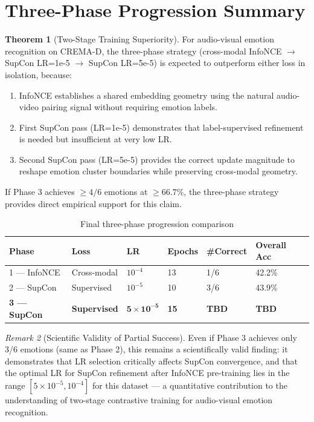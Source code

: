 \documentclass[12pt,a4paper]{article}
\theoremstyle{definition}
\newtheorem{theorem}{Theorem}[section]
\theoremstyle{remark}
\newtheorem{remark}[theorem]{Remark}
\begin{document}
\section{Three-Phase Progression Summary}

\begin{theorem}[Two-Stage Training Superiority]
For audio-visual emotion recognition on CREMA-D, the three-phase strategy
(cross-modal InfoNCE $\to$ SupCon LR=1e-5 $\to$ SupCon LR=5e-5) is
expected to outperform either loss in isolation, because:
\begin{enumerate}
  \item InfoNCE establishes a shared embedding geometry using the natural
        audio-video pairing signal without requiring emotion labels.
  \item First SupCon pass (LR=1e-5) demonstrates that label-supervised
        refinement is needed but insufficient at very low LR.
  \item Second SupCon pass (LR=5e-5) provides the correct update magnitude
        to reshape emotion cluster boundaries while preserving cross-modal geometry.
\end{enumerate}
If Phase 3 achieves $\geq 4/6$ emotions at $\geq 66.7\%$, the three-phase
strategy provides direct empirical support for this claim.
\end{theorem}

\begin{table}[H]
\centering
\caption{Final three-phase progression comparison}
\begin{tabularx}{\textwidth}{lXllll}
\toprule
Phase & Loss & LR & Epochs & \#Correct & Overall Acc \\
\midrule
1 — InfoNCE  & Cross-modal & $10^{-4}$ & 13 & 1/6 & 42.2\% \\
2 — SupCon   & Supervised  & $10^{-5}$ & 10 & 3/6 & 43.9\% \\
\textbf{3 — SupCon} & \textbf{Supervised} & $\mathbf{5\times10^{-5}}$ & \textbf{15} & \textbf{TBD} & \textbf{TBD} \\
\bottomrule
\end{tabularx}
\end{table}

\begin{remark}[Scientific Validity of Partial Success]
Even if Phase 3 achieves only 3/6 emotions (same as Phase 2),
this remains a scientifically valid finding: it demonstrates that
LR selection critically affects SupCon convergence, and that
the optimal LR for SupCon refinement after InfoNCE pre-training
lies in the range $[5\times10^{-5}, 10^{-4}]$ for this dataset —
a quantitative contribution to the understanding of two-stage
contrastive training for audio-visual emotion recognition.
\end{remark}
\end{document}
